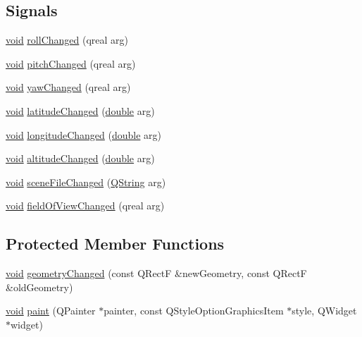 \subsection*{Signals}
\begin{DoxyCompactItemize}
\item 
\hyperlink{group___u_a_v_objects_plugin_ga444cf2ff3f0ecbe028adce838d373f5c}{void} \hyperlink{class_osg_earth_item_adfb0742e8a1938cd6007e6853e9ee3a4}{roll\-Changed} (qreal arg)
\item 
\hyperlink{group___u_a_v_objects_plugin_ga444cf2ff3f0ecbe028adce838d373f5c}{void} \hyperlink{class_osg_earth_item_aa74e77eda223ecf64c45a8eec1219afe}{pitch\-Changed} (qreal arg)
\item 
\hyperlink{group___u_a_v_objects_plugin_ga444cf2ff3f0ecbe028adce838d373f5c}{void} \hyperlink{class_osg_earth_item_a2119a20a59ddce5203ced1b153a7e720}{yaw\-Changed} (qreal arg)
\item 
\hyperlink{group___u_a_v_objects_plugin_ga444cf2ff3f0ecbe028adce838d373f5c}{void} \hyperlink{class_osg_earth_item_a93399296bc97a6dad5b0e2e89580d2b8}{latitude\-Changed} (\hyperlink{_super_l_u_support_8h_a8956b2b9f49bf918deed98379d159ca7}{double} arg)
\item 
\hyperlink{group___u_a_v_objects_plugin_ga444cf2ff3f0ecbe028adce838d373f5c}{void} \hyperlink{class_osg_earth_item_a10af4acdf6fdd9a1379e7e416f7a7f89}{longitude\-Changed} (\hyperlink{_super_l_u_support_8h_a8956b2b9f49bf918deed98379d159ca7}{double} arg)
\item 
\hyperlink{group___u_a_v_objects_plugin_ga444cf2ff3f0ecbe028adce838d373f5c}{void} \hyperlink{class_osg_earth_item_ac82d42d70bd8ba940faa08ac2b6bb591}{altitude\-Changed} (\hyperlink{_super_l_u_support_8h_a8956b2b9f49bf918deed98379d159ca7}{double} arg)
\item 
\hyperlink{group___u_a_v_objects_plugin_ga444cf2ff3f0ecbe028adce838d373f5c}{void} \hyperlink{class_osg_earth_item_a85e722a4910927d8f034c3bda371e104}{scene\-File\-Changed} (\hyperlink{group___u_a_v_objects_plugin_gab9d252f49c333c94a72f97ce3105a32d}{Q\-String} arg)
\item 
\hyperlink{group___u_a_v_objects_plugin_ga444cf2ff3f0ecbe028adce838d373f5c}{void} \hyperlink{class_osg_earth_item_a4d93ba686b26c3525d3708b97c04ff67}{field\-Of\-View\-Changed} (qreal arg)
\end{DoxyCompactItemize}
\subsection*{Protected Member Functions}
\begin{DoxyCompactItemize}
\item 
\hyperlink{group___u_a_v_objects_plugin_ga444cf2ff3f0ecbe028adce838d373f5c}{void} \hyperlink{class_osg_earth_item_a80b5e7d3a3e8901f5d641ad7fdd0e681}{geometry\-Changed} (const Q\-Rect\-F \&new\-Geometry, const Q\-Rect\-F \&old\-Geometry)
\item 
\hyperlink{group___u_a_v_objects_plugin_ga444cf2ff3f0ecbe028adce838d373f5c}{void} \hyperlink{class_osg_earth_item_a6c82923b88816b31454b4c0b4f40a6b2}{paint} (Q\-Painter $\ast$painter, const Q\-Style\-Option\-Graphics\-Item $\ast$style, Q\-Widget $\ast$widget)
\end{DoxyCompactItemize}


